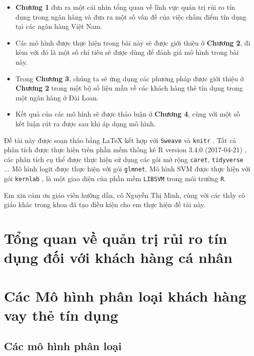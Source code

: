 \documentclass[a4paper]{report}\usepackage[]{graphicx}\usepackage[]{color}
\begin{document}
\begin{itemize}
\item \textbf{Chương 1} đưa ra một cái nhìn tổng quan về lĩnh vực quản trị rủi ro tín dụng trong ngân hàng và đưa ra một số vấn đề của việc chấm điểm tín dụng tại các ngân hàng Việt Nam.
\item Các mô hình được thực hiện trong bài này sẽ được giới thiệu ở \textbf{Chương 2}, đi kèm với đó là một số chỉ tiêu sẽ được dùng để đánh giá mô hình trong bài này.
\item Trong \textbf{Chương 3}, chúng ta sẽ ứng dụng các phương pháp được giới thiệu ở \textbf{Chương 2} trong một bộ số liệu mẫu về các khách hàng thẻ tín dụng trong một ngân hàng ở Đài Loan.
\item Kết quả của các mô hình sẽ được thảo luận ở \textbf{Chương 4}, cùng với một số kết luận rút ra được sau khi áp dụng mô hình.
\end{itemize}

Đề tài này được soạn thảo bằng \LaTeX{} kết hợp với \texttt{Sweave} và \texttt{knitr} 
\parencite{r:knitr}. Tất cả phân tích được thực hiện trên phần mềm thống kê 
R version 3.4.0 (2017-04-21) \parencite{r:rbase},  
các phân tích cụ thể được thực hiện sử dụng các gói mở rộng \texttt{caret}\parencite{r:caret}, \texttt{tidyverse} \parencite{r:tidyverse}... Mô hình logit được thực hiện với gói \texttt{glmnet}\parencite{r:glmnet}. 
Mô hình SVM được thực hiện với gói \texttt{kernlab} \parencite{r:kernlab}, là một giao diện của phần mềm \texttt{LIBSVM} \parencite{CC01a} trong môi trường \texttt{R}.

Em xin cảm ơn giáo viên hướng dẫn, cô Nguyễn Thị Minh, cùng với các thầy cô giáo khác trong khoa đã tạo điều kiện cho em thực hiện đề tài này.


\chapter{Tổng quan về quản trị rủi ro tín dụng đối với khách hàng cá nhân}



\chapter{Các Mô hình phân loại khách hàng vay thẻ tín dụng}
\section{Các mô hình phân loại}
\end{document}

